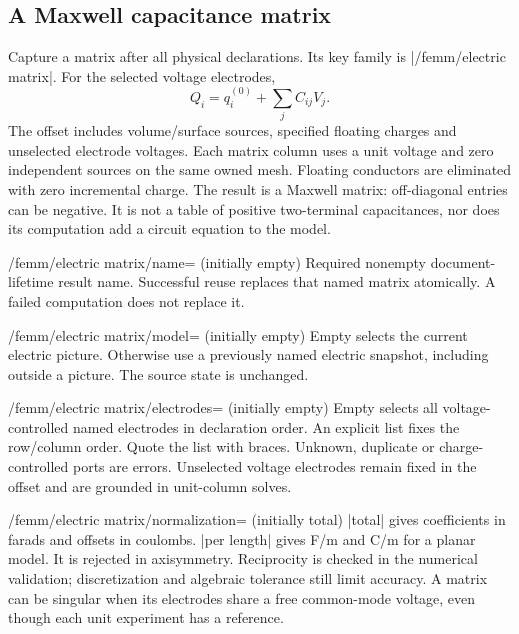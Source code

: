 \subsection{A Maxwell capacitance matrix}
\begin{command}{\femmelectricmatrix{}}
Capture a matrix after all physical declarations.
Its key family is |/femm/electric matrix|. For the selected voltage electrodes,
\[
 Q_i=q_i^{(0)}+\sum_j C_{ij}V_j.
\]
The offset includes volume/surface sources, specified floating charges and
unselected electrode voltages. Each matrix column uses a unit voltage and
zero independent sources on the same owned mesh. Floating conductors are
eliminated with zero incremental charge. The result is a Maxwell matrix:
off-diagonal entries can be negative. It is not a table of positive two-terminal
capacitances, nor does its computation add a circuit equation to the model.
\end{command}
\begin{key}{/femm/electric matrix/name= (initially empty)}
Required nonempty document-lifetime result name. Successful reuse replaces
that named matrix atomically. A failed computation does not replace it.
\end{key}
\begin{key}{/femm/electric matrix/model= (initially empty)}
Empty selects the current electric picture. Otherwise use a previously named
electric snapshot, including outside a picture. The source state is unchanged.
\end{key}
\begin{key}{/femm/electric matrix/electrodes= (initially empty)}
Empty selects all voltage-controlled named electrodes in declaration order.
An explicit list fixes the row/column order. Quote the list with braces.
Unknown, duplicate or charge-controlled ports are errors. Unselected voltage
electrodes remain fixed in the offset and are grounded in unit-column solves.
\end{key}
\begin{key}{/femm/electric matrix/normalization= (initially total)}
|total| gives coefficients in farads and offsets in coulombs. |per length|
gives F/m and C/m for a planar model. It is rejected in axisymmetry. Reciprocity
is checked in the numerical validation; discretization and algebraic tolerance
still limit accuracy. A matrix can be singular when its electrodes share a
free common-mode voltage, even though each unit experiment has a reference.
\end{key}
